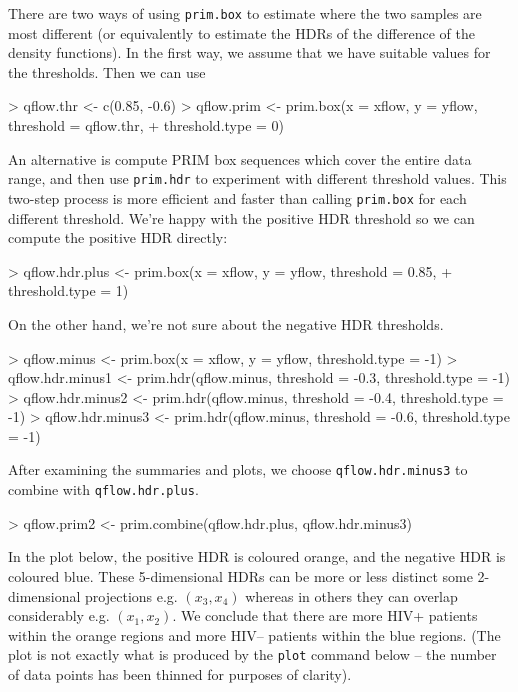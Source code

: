\documentclass[a4paper,11pt]{article}
\begin{document}
There are two ways of using \texttt{prim.box} to estimate where the 
two samples are most different (or equivalently 
to estimate the HDRs of the difference of the density functions). 
In the first way, we assume that we have suitable
values for the thresholds. Then we can use
\begin{Schunk}
\begin{Sinput}
> qflow.thr <- c(0.85, -0.6)
> qflow.prim <- prim.box(x = xflow, y = yflow, threshold = qflow.thr, 
+     threshold.type = 0)
\end{Sinput}
\end{Schunk}

An alternative is compute PRIM box sequences which cover the entire data range, 
and then use \texttt{prim.hdr} to experiment with different threshold values.
This two-step process is more efficient and faster than calling \texttt{prim.box}
for each different threshold.
We're happy with the positive HDR threshold so we can compute the positive
HDR directly: 
\begin{Schunk}
\begin{Sinput}
> qflow.hdr.plus <- prim.box(x = xflow, y = yflow, threshold = 0.85, 
+     threshold.type = 1)
\end{Sinput}
\end{Schunk}
On the other hand, we're not sure about the negative HDR thresholds.
\begin{Schunk}
\begin{Sinput}
> qflow.minus <- prim.box(x = xflow, y = yflow, threshold.type = -1)
> qflow.hdr.minus1 <- prim.hdr(qflow.minus, threshold = -0.3, threshold.type = -1)
> qflow.hdr.minus2 <- prim.hdr(qflow.minus, threshold = -0.4, threshold.type = -1)
> qflow.hdr.minus3 <- prim.hdr(qflow.minus, threshold = -0.6, threshold.type = -1)
\end{Sinput}
\end{Schunk}
After examining the summaries and plots, we  
choose \texttt{qflow.hdr.minus3} to combine with \texttt{qflow.hdr.plus}.
\begin{Schunk}
\begin{Sinput}
> qflow.prim2 <- prim.combine(qflow.hdr.plus, qflow.hdr.minus3)
\end{Sinput}
\end{Schunk}
In the plot below, the positive HDR is coloured orange, and the 
negative HDR is coloured blue.  
These 5-dimensional HDRs can be more or less distinct some 2-dimensional
projections e.g. $(x_3, x_4)$ whereas in others they
can overlap considerably e.g. $(x_1, x_2)$.
We conclude that there are more HIV+ patients
within the orange regions and more HIV-- patients within the blue regions. 
(The plot is not exactly what is produced by the \texttt{plot} command
below -- the number of data points has been thinned for purposes of clarity).
 
\end{document}
